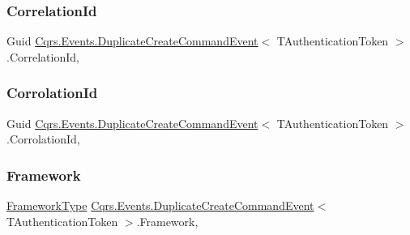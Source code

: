 \subsubsection{\texorpdfstring{Correlation\+Id}{CorrelationId}}
{\footnotesize\ttfamily Guid \hyperlink{classCqrs_1_1Events_1_1DuplicateCreateCommandEvent}{Cqrs.\+Events.\+Duplicate\+Create\+Command\+Event}$<$ T\+Authentication\+Token $>$.Correlation\+Id\hspace{0.3cm}{\ttfamily [get]}, {\ttfamily [set]}}

\mbox{\label{classCqrs_1_1Events_1_1DuplicateCreateCommandEvent_a09f55bcafebdc68ef2440031d558da0a_a09f55bcafebdc68ef2440031d558da0a}} 
\subsubsection{\texorpdfstring{Corrolation\+Id}{CorrolationId}}
{\footnotesize\ttfamily Guid \hyperlink{classCqrs_1_1Events_1_1DuplicateCreateCommandEvent}{Cqrs.\+Events.\+Duplicate\+Create\+Command\+Event}$<$ T\+Authentication\+Token $>$.Corrolation\+Id\hspace{0.3cm}{\ttfamily [get]}, {\ttfamily [set]}}

\mbox{\label{classCqrs_1_1Events_1_1DuplicateCreateCommandEvent_af22f0d27a301ca163314550b8991d922_af22f0d27a301ca163314550b8991d922}} 
\subsubsection{\texorpdfstring{Framework}{Framework}}
{\footnotesize\ttfamily \hyperlink{namespaceCqrs_1_1Messages_af06a7e6cd2609043d0f2f5f3419f81e3_af06a7e6cd2609043d0f2f5f3419f81e3}{Framework\+Type} \hyperlink{classCqrs_1_1Events_1_1DuplicateCreateCommandEvent}{Cqrs.\+Events.\+Duplicate\+Create\+Command\+Event}$<$ T\+Authentication\+Token $>$.Framework\hspace{0.3cm}{\ttfamily [get]}, {\ttfamily [set]}}

